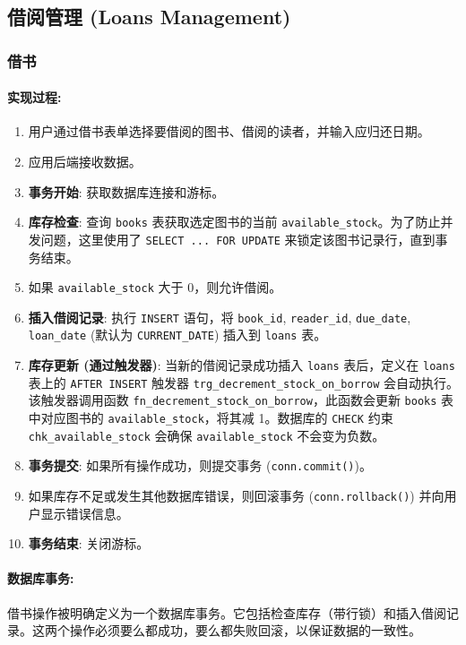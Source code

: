 \documentclass[11pt, a4paper]{article}
\begin{document}
\subsection{借阅管理 (Loans Management)}

\subsubsection{借书}
\paragraph{实现过程:}
\begin{enumerate}
    \item 用户通过借书表单选择要借阅的图书、借阅的读者，并输入应归还日期。
    \item 应用后端接收数据。
    \item \textbf{事务开始}: 获取数据库连接和游标。
    \item \textbf{库存检查}: 查询 \texttt{books} 表获取选定图书的当前 \texttt{available\_stock}。为了防止并发问题，这里使用了 \texttt{SELECT ... FOR UPDATE} 来锁定该图书记录行，直到事务结束。
    \item 如果 \texttt{available\_stock} 大于 0，则允许借阅。
    \item \textbf{插入借阅记录}: 执行 \texttt{INSERT} 语句，将 \texttt{book\_id}, \texttt{reader\_id}, \texttt{due\_date}, \texttt{loan\_date} (默认为 \texttt{CURRENT\_DATE}) 插入到 \texttt{loans} 表。
    \item \textbf{库存更新 (通过触发器)}: 当新的借阅记录成功插入 \texttt{loans} 表后，定义在 \texttt{loans} 表上的 \texttt{AFTER INSERT} 触发器 \texttt{trg\_decrement\_stock\_on\_borrow} 会自动执行。该触发器调用函数 \texttt{fn\_decrement\_stock\_on\_borrow}，此函数会更新 \texttt{books} 表中对应图书的 \texttt{available\_stock}，将其减 1。数据库的 \texttt{CHECK} 约束 \texttt{chk\_available\_stock} 会确保 \texttt{available\_stock} 不会变为负数。
    \item \textbf{事务提交}: 如果所有操作成功，则提交事务 (\texttt{conn.commit()})。
    \item 如果库存不足或发生其他数据库错误，则回滚事务 (\texttt{conn.rollback()}) 并向用户显示错误信息。
    \item \textbf{事务结束}: 关闭游标。
\end{enumerate}
\paragraph{数据库事务:}
借书操作被明确定义为一个数据库事务。它包括检查库存（带行锁）和插入借阅记录。这两个操作必须要么都成功，要么都失败回滚，以保证数据的一致性。
\end{document}
